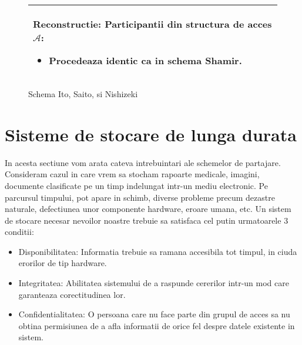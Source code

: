 \documentclass{llncs}
\begin{document}
\begin{figure*}[h!]
\begin{tabular}{|p{\textwidth}|}
\hspace{.1in}
\textbf{Reconstructie}: Participantii din structura de acces $\mathcal{A}$:
	\begin{itemize}
		\item Procedeaza identic ca in schema Shamir.
	\end{itemize}


\\
\hline
\end{tabular}

\caption{Schema Ito, Saito, si Nishizeki \cite{ITO:1989}}
\label{fig:ito_et_al}
\end{figure*}





\section{Sisteme de stocare de lunga durata}

In acesta sectiune vom arata cateva intrebuintari ale schemelor de partajare. Consideram cazul in care vrem sa stocham rapoarte medicale, imagini, documente clasificate pe un timp indelungat intr-un mediu electronic. Pe parcursul timpului, pot apare in schimb, diverse probleme precum dezastre naturale, defectiunea unor componente hardware, eroare umana, etc. \cite{SGMV:2009}
Un sistem de stocare necesar nevoilor noastre trebuie sa satisfaca cel putin urmatoarele 3 conditii:
\begin{itemize}
	\item Disponibilitatea: Informatia trebuie sa ramana accesibila tot timpul, in ciuda erorilor de tip hardware.
	\item Integritatea: Abilitatea sistemului de a raspunde cererilor intr-un mod care garanteaza corectitudinea lor.
	\item Confidentialitatea: O persoana care nu face parte din grupul de acces sa nu obtina permisiunea de a afla informatii de orice fel despre datele existente in sistem.
\end{itemize}
\end{document}
